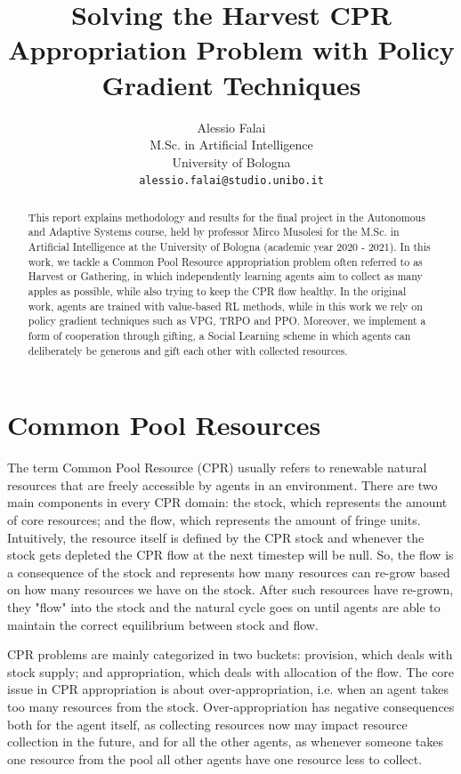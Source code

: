 \documentclass{article}
\title{Solving the Harvest CPR Appropriation Problem with Policy Gradient Techniques}
\author{
  Alessio Falai\\
  M.Sc. in Artificial Intelligence\\
  University of Bologna\\
  \texttt{alessio.falai@studio.unibo.it} \\
}
\begin{document}
\maketitle

\begin{abstract}
  This report explains methodology and results for the final project in the Autonomous and Adaptive Systems course, held by professor Mirco Musolesi for the M.Sc. in Artificial Intelligence at the University of Bologna (academic year 2020 - 2021). In this work, we tackle a Common Pool Resource appropriation problem often referred to as Harvest or Gathering, in which independently learning agents aim to collect as many apples as possible, while also trying to keep the CPR flow healthy. In the original work, agents are trained with value-based RL methods, while in this work we rely on policy gradient techniques such as VPG, TRPO and PPO. Moreover, we implement a form of cooperation through gifting, a Social Learning scheme in which agents can deliberately be generous and gift each other with collected resources.
\end{abstract}

\section{Common Pool Resources}
The term Common Pool Resource (CPR) usually refers to renewable natural resources that are freely accessible by agents in an environment. There are two main components in every CPR domain: the stock, which represents the amount of core resources; and the flow, which represents the amount of fringe units. Intuitively, the resource itself is defined by the CPR stock and whenever the stock gets depleted the CPR flow at the next timestep will be null. So, the flow is a consequence of the stock and represents how many resources can re-grow based on how many resources we have on the stock. After such resources have re-grown, they "flow" into the stock and the natural cycle goes on until agents are able to maintain the correct equilibrium between stock and flow. 

CPR problems are mainly categorized in two buckets: provision, which deals with stock supply; and appropriation, which deals with allocation of the flow. The core issue in CPR appropriation is about over-appropriation, i.e. when an agent takes too many resources from the stock. Over-appropriation has negative consequences both for the agent itself, as collecting resources now may impact resource collection in the future, and for all the other agents, as whenever someone takes one resource from the pool all other agents have one resource less to collect.
\end{document}
